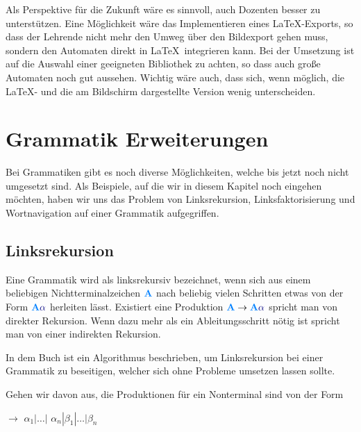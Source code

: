 Als Perspektive für die Zukunft wäre es sinnvoll, auch Dozenten besser zu
unterstützen. Eine Möglichkeit wäre das Implementieren eines \LaTeX-Exports, so
dass der Lehrende nicht mehr den Umweg über den Bildexport gehen muss, sondern
den Automaten direkt in \LaTeX\ integrieren kann. Bei der Umsetzung ist auf die
Auswahl einer geeigneten Bibliothek zu achten, so dass auch große Automaten
noch gut aussehen. Wichtig wäre auch, dass sich, wenn möglich, die \LaTeX-
und die am Bildschirm dargestellte Version wenig unterscheiden.\vspace{10pt}


\section{Grammatik Erweiterungen}

Bei Grammatiken gibt es noch diverse Möglichkeiten, welche bis jetzt noch nicht
umgesetzt sind. Als Beispiele, auf die wir in diesem Kapitel noch eingehen
möchten, haben wir uns das Problem von Linksrekursion, Linksfaktorisierung und
Wortnavigation auf einer Grammatik aufgegriffen.\vspace{10pt}

\subsection{Linksrekursion}

Eine Grammatik wird als linksrekursiv bezeichnet, wenn sich aus einem beliebigen
Nichtterminalzeichen $\NonterminalSymbol{A}$ nach beliebig vielen Schritten etwas
von der Form $\NonterminalSymbol{A} \TerminalSymbol{$\alpha$}$ herleiten lässt.
Existiert eine Produktion $\NonterminalSymbol{A} \to \NonterminalSymbol{A}
\TerminalSymbol{$\alpha$}$ spricht man von direkter Rekursion. Wenn dazu mehr als
ein Ableitungsschritt nötig ist spricht man von einer indirekten
Rekursion.\vspace{10pt}

In dem Buch \cite{Compilers} ist ein Algorithmus beschrieben, um Linksrekursion
bei einer Grammatik zu beseitigen, welcher sich ohne Probleme umsetzen lassen
sollte.\vspace{10pt}

\noindent Gehen wir davon aus, die Produktionen für ein Nonterminal
 sind von der Form\vspace{10pt}

 $\to$ $\alpha_1|\ldots|$
$\alpha_n | \beta_1 | \ldots | \beta_n$\vspace{10pt}

